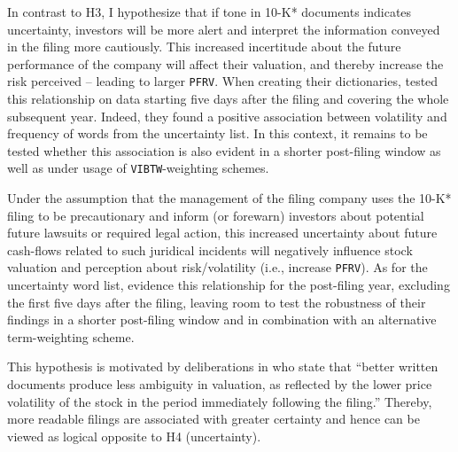 
In contrast to H3, I hypothesize that if tone in 10-K* documents indicates uncertainty, investors will be more alert and interpret the information conveyed in the filing more cautiously. This increased incertitude about the future performance of the company will affect their valuation, and thereby increase the risk perceived -- leading to larger \texttt{PFRV}. When creating their dictionaries, \textcite{Loughran2011} tested this relationship on data starting five days after the filing and covering the whole subsequent year. Indeed, they found a positive association between volatility and frequency of words from the uncertainty list. In this context, it remains to be tested whether this association is also evident in a shorter post-filing window as well as under usage of \texttt{VIBTW}-weighting schemes.


Under the assumption that the management of the filing company uses the 10-K* filing to be precautionary and inform (or forewarn) investors about potential future lawsuits or required legal action, this increased uncertainty about future cash-flows related to such juridical incidents will negatively influence stock valuation and perception about risk/volatility (i.e., increase \texttt{PFRV}). As for the uncertainty word list, \textcite{Loughran2011} evidence this relationship for the post-filing year, excluding the first five days after the filing, leaving room to test the robustness of their findings in a shorter post-filing window and in combination with an alternative term-weighting scheme. 


This hypothesis is motivated by deliberations in \textcite[1644]{Loughran2014} who state that \enquote{better written documents produce less ambiguity in valuation, as reflected by the lower price volatility of the stock in the period immediately following the filing.} Thereby, more readable filings are associated with greater certainty and hence can be viewed as logical opposite to H4 (uncertainty). 


